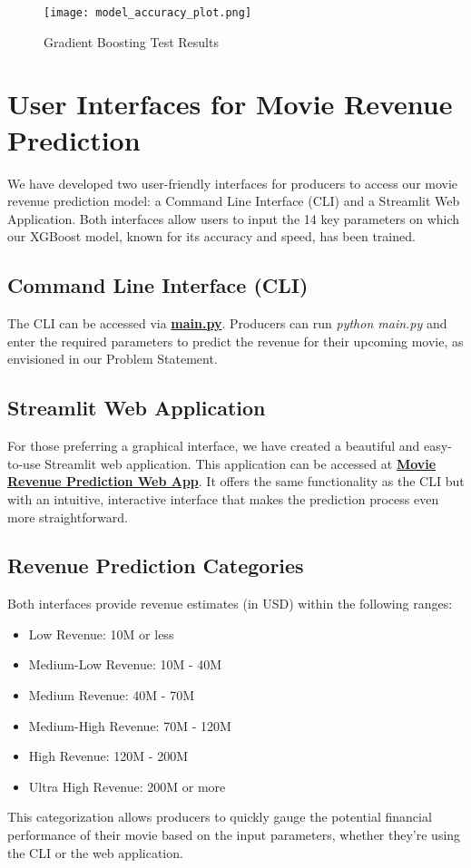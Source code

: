 \documentclass[conference]{IEEEtran}
\begin{document}
    \begin{figure}[h]
        \centering
        \texttt{[image: model\_accuracy\_plot.png]}
        \caption{Gradient Boosting Test Results}
        \label{fig:gradient_boosting_test}
    \end{figure}

\section{User Interfaces for Movie Revenue Prediction}
    We have developed two user-friendly interfaces for producers to access our movie revenue prediction model: a Command Line Interface (CLI) and a Streamlit Web Application. Both interfaces allow users to input the 14 key parameters on which our XGBoost model, known for its accuracy and speed, has been trained.
    \subsection{Command Line Interface (CLI)}
        The CLI can be accessed via \href{https://github.com/Vikranth3140/Movie-Revenue-Prediction/blob/main/main.py}{\textbf{main.py}}. Producers can run \textit{python main.py} and enter the required parameters to predict the revenue for their upcoming movie, as envisioned in our Problem Statement.
    \subsection{Streamlit Web Application}
        For those preferring a graphical interface, we have created a beautiful and easy-to-use Streamlit web application. This application can be accessed at \href{https://movie-revenue-prediction.streamlit.app}{\textbf{Movie Revenue Prediction Web App}}. It offers the same functionality as the CLI but with an intuitive, interactive interface that makes the prediction process even more straightforward.
    \subsection{Revenue Prediction Categories}
        Both interfaces provide revenue estimates (in USD) within the following ranges:
        \begin{itemize}
        \item Low Revenue: 10M or less
        \item Medium-Low Revenue: 10M - 40M
        \item Medium Revenue: 40M - 70M
        \item Medium-High Revenue: 70M - 120M
        \item High Revenue: 120M - 200M
        \item Ultra High Revenue: 200M or more
        \end{itemize}
    This categorization allows producers to quickly gauge the potential financial performance of their movie based on the input parameters, whether they're using the CLI or the web application.
\end{document}
